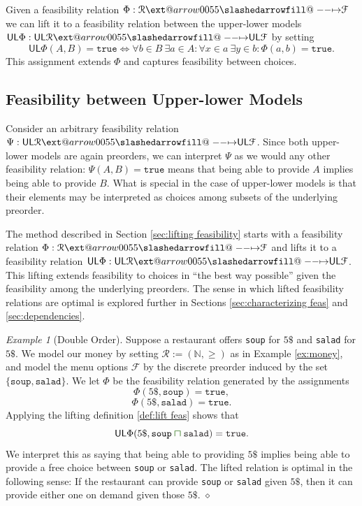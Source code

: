 \documentclass[12pt]{article}
\makeatletter
\theoremstyle{definition}
\theoremstyle{plain}
\theoremstyle{plain}
\theoremstyle{plain}
\theoremstyle{plain}
\theoremstyle{remark}
\newtheorem{example}[definition]{Example}
\newcommand\xqed[1]{%
	\leavevmode\unskip\penalty9999 \hbox{}\nobreak\hfill
	\quad\hbox{#1}}
\newcommand\exampleend{\xqed{$\diamond$}}
\theoremstyle{remark}
\newcommand{\mc}[1]{\mathcal{#1}}
\newcommand{\low}{\mathsf{L}}
\newcommand{\upper}{\mathsf{U}}
\newcommand{\true}{\mathtt{true}}
\def\slashedarrowfill@#1#2#3#4#5{%
	$\m@th\thickmuskip0mu\medmuskip\thickmuskip\thinmuskip\thickmuskip
	\relax#5#1\mkern-7mu%
	\cleaders\hbox{$#5\mkern-2mu#2\mkern-2mu$}\hfill
	\mathclap{#3}\mathclap{#2}%
	\cleaders\hbox{$#5\mkern-2mu#2\mkern-2mu$}\hfill
	\mkern-7mu#4$%
}
\def\rightslashedarrowfill@{%
	\slashedarrowfill@\relbar\relbar\mapstochar\rightarrow}
\newcommand\xslashedrightarrow[2][]{%
	\ext@arrow 0055{\rightslashedarrowfill@}{#1}{#2}}
\newcommand{\csqcap}{\color{OliveGreen}\bm{\sqcap}\color{Black}}
\makeatother
\begin{document}
\begin{tcolorbox}[title=Lifting Feasibility to the Upper-lower Model, colframe=Apricot, colback = paleorange, coltitle = Sepia]
	Given a feasibility relation $\Phi: \mc{R} \xslashedrightarrow{} \mc{F}$ we can lift it to a feasibility relation between the upper-lower models $\upper\low\Phi: \upper\low\mc{R} \xslashedrightarrow{} \upper\low\mc{F}$ by setting
	$$ \upper\low\Phi(A,B) = \true \Leftrightarrow \forall b \in B \: \exists a \in A: \forall x \in a \: \exists y \in b: \Phi(a,b) = \true.$$
	This assignment extends $\Phi$ and captures feasibility between choices.
\end{tcolorbox}

\subsection{Feasibility between Upper-lower Models}
Consider an arbitrary feasibility relation $\Psi: \upper\low\mc{R} \xslashedrightarrow{} \upper\low\mc{F}$. Since both upper-lower models are again preorders, we can interpret $\Psi$ as we would any other feasibility relation: $\Psi(A,B) = \true$ means that being able to provide $A$ implies being able to provide $B$. What is special in the case of upper-lower models is that their elements may be interpreted as choices among subsets of the underlying preorder.

The method described in Section \ref{sec:lifting feasibility} starts with a feasibility relation $\Phi: \mc{R} \xslashedrightarrow{} \mc{F}$ and lifts it to a feasibility relation $\upper\low\Phi: \upper\low\mc{R} \xslashedrightarrow{} \upper\low\mc{F}$. This lifting extends feasibility to choices in ``the best way possible'' given the feasibility among the underlying preorders. The sense in which lifted feasibility relations are optimal is explored further in Sections \ref{sec:characterizing feas} and \ref{sec:dependencies}.

\begin{example}[Double Order]\label{ex:double order}
	Suppose a restaurant offers \texttt{soup} for $5\$$ and \texttt{salad} for $5\$$. We model our money by setting $\mc{R} := (\mathbb{N}, \geq)$ as in Example \ref{ex:money}, and model the menu options $\mc{F}$ by the discrete preorder induced by the set $\{\mathtt{soup}, \mathtt{salad} \}$. We let $\Phi$ be the feasibility relation generated by the assignments 
	$$ \Phi(5\$, \mathtt{soup}) = \true,$$
	$$ \Phi(5\$, \mathtt{salad}) = \true.$$
	Applying the lifting definition \ref{def:lift feas} shows that 
	$$\upper\low\Phi(5\$, \mathtt{soup} \csqcap \mathtt{salad}) =\true.$$
	We interpret this as saying that being able to providing $5\$$ implies being able to provide a free choice between \texttt{soup} or \texttt{salad}. The lifted relation is optimal in the following sense: If the restaurant can provide \texttt{soup} or \texttt{salad} given $5\$$, then it can provide either one on demand given those $5\$$. \exampleend
\end{example}
\end{document}
